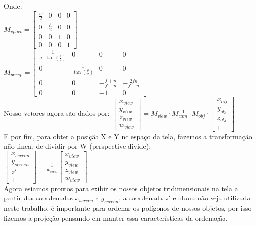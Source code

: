 \documentclass[12pt]{article}
\begin{document}
\noindent
Onde:
\\[\baselineskip]
$M_{vport} =
\begin{bmatrix}
    \frac{w}{2} & 0 & 0 & 0 \\
    0 & \frac{h}{2} & 0 & 0 \\
    0 & 0 & 1 & 0 \\
    0 & 0 & 0 & 1
\end{bmatrix}   $ 
\\[\baselineskip]
$M_{persp} =
\begin{bmatrix}
    \frac{1}{a \cdot \tan(\frac{\theta}{2})} & 0 & 0 & 0 \\    
    0 & \frac{1}{\tan(\frac{\theta}{2})} & 0 & 0 \\    
    0 & 0 & -\frac{f+n}{f-n} & -\frac{2fn}{f-n} \\
    0 & 0 & -1 & 0 
\end{bmatrix}$
\\[\baselineskip]
Nosso vetores agora são dados por:
\noindent
\boldmath{}
$
\begin{bmatrix}
x_{view} \\
y_{view} \\
z_{view} \\
w_{view}
\end{bmatrix}
=
M_{view} \cdot M_{cam}^{-1} \cdot M_{obj} \cdot 
\begin{bmatrix}
x_{obj} \\
y_{obj} \\
z_{obj} \\
1    
\end{bmatrix}
$
\unboldmath{}
\\[\baselineskip]
E por fim, para obter a posição X e Y no espaço da tela, fazemos a transformação não linear de dividir por W (perspective divide):
\\[\baselineskip]
$
\begin{bmatrix}
x_{screen} \\
y_{screen} \\
z' \\
1
\end{bmatrix}
=
\frac{1}{w_{view}}
\begin{bmatrix}
    x_{view} \\
    y_{view} \\
    z_{view} \\
    w_{view}
\end{bmatrix}
$
\\[\baselineskip]
Agora estamos prontos para exibir os nossos objetos tridimensionais na tela a partir das coordenadas $x_{screen}$ e $y_{screen}$, a coordenada $z'$ embora não seja utilizada neste trabalho, é importante para ordenar os polígonos de nossos objetos, por isso fizemos a projeção pensando em manter essa características da ordenação.
\end{document}
